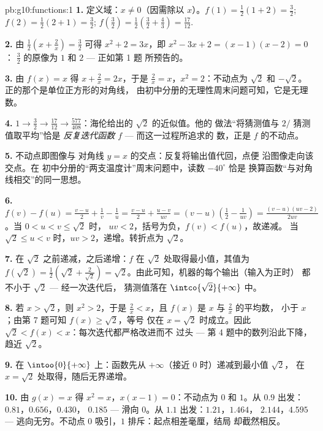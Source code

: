 \begin{solution}{pb:g10:functions:1}
\textbf{1.} 定义域：$x \neq 0$（因需除以 $x$）。$f(1) =
\frac12(1 + 2) = \frac32$; $f(2) = \frac12(2 + 1) = \frac32$;
$f\!\left(\frac32\right) = \frac12\left(\frac32 +
\frac43\right) = \frac{17}{12}$.

\textbf{2.} 由 $\frac12\left(x + \frac2x\right) = \frac32$ 可得
$x^2 + 2 = 3x$，即 $x^2 - 3x + 2 = (x - 1)(x - 2) = 0$：
$\frac32$ 的原像为 $1$ 和 $2$ --- 正如第 1 题
所预告的。

\textbf{3.} 由 $f(x) = x$ 得 $x + \frac2x = 2x$，于是
$\frac2x = x$，$x^2 = 2$：不动点为 $\sqrt2$ 和 $-\sqrt2$。
正的那个是单位正方形的对角线，
由初中分册的无理性周末问题可知，它是无理数。

\textbf{4.} $1 \to \frac32 \to \frac{17}{12} \to
\frac{577}{408}$：海伦给出的 $\sqrt2$ 的近似值。他的
做法“将猜测值与 $2/$ 猜测值取平均”恰是
\emph{反复迭代函数 $f$} --- 而这一过程所追求的
数，正是 $f$ 的不动点。

\textbf{5.} 不动点即图像与
对角线 $y = x$ 的交点：反复将输出值代回，点便
沿图像走向该交点。在
初中分册的“两支温度计”周末问题中，读数 $-40^\circ$ 恰是
换算函数“与对角线相交”的同一思想。

\textbf{6.} $f(v) - f(u) = \frac{v - u}{2} + \frac1v - \frac1u
= \frac{v - u}{2} + \frac{u - v}{uv}
= (v - u)\left(\frac12 - \frac{1}{uv}\right)
= \frac{(v - u)(uv - 2)}{2uv}$。当 $0 < u < v \leq \sqrt2$ 时，
$uv < 2$，括号为负，$f(v) < f(u)$，故递减。
当 $\sqrt2 \leq u < v$ 时，$uv > 2$，递增。转折点为
$\sqrt2$。

\textbf{7.} 在 $\sqrt2$ 之前递减，之后递增：$f$
在 $\sqrt2$ 处取得最小值，其值为
$f(\sqrt2) = \frac12\left(\sqrt2 + \frac{2}{\sqrt2}\right)
= \sqrt2$。由此可知，机器的每个输出（输入为正时）
都不小于 $\sqrt2$ --- 经一次迭代后，
猜测值落在 $\intco{\sqrt2}{+\infty}$ 中。

\textbf{8.} 若 $x > \sqrt2$，则 $x^2 > 2$，于是
$\frac2x < x$，且 $f(x)$ 是 $x$ 与 $\frac2x$ 的平均数，
小于 $x$；由第 7 题可知 $f(x) \geq \sqrt2$，等号
仅在 $x = \sqrt2$ 时成立。因此
$\sqrt2 < f(x) < x$：每次迭代都严格改进而不
过头 --- 第 4 题中的数列沿此下降，趋近
$\sqrt2$。

\textbf{9.} 在 $\intoo{0}{+\infty}$ 上：函数先从
$+\infty$（接近 $0$ 时）递减到最小值 $\sqrt2$，
在 $x = \sqrt2$ 处取得，随后无界递增。

\textbf{10.} 由 $g(x) = x$ 得 $x^2 = x$，$x(x - 1) = 0$：不动点为
$0$ 和 $1$。从 $0.9$ 出发：$0.81$，$0.656$，$0.430$，
$0.185$ --- 滑向 $0$。从 $1.1$ 出发：$1.21$，$1.464$，
$2.144$，$4.595$ --- 逃向无穷。不动点 $0$
吸引，$1$ 排斥：起点相差毫厘，结局
却截然相反。


\end{solution}
